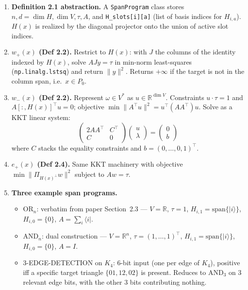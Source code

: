 \documentclass[11pt]{article}
\begin{document}
\begin{enumerate}
\item \textbf{Definition 2.1 abstraction.} A \texttt{SpanProgram} class stores $n, d = \dim H, \dim V, \tau, A$, and \texttt{H\_slots[i][a]} (list of basis indices for $H_{i,a}$). $H(x)$ is realized by the diagonal projector onto the union of active slot indices.

\item \textbf{$w_+(x)$ (Def 2.2).} Restrict to $H(x)$: with $J$ the columns of the identity indexed by $H(x)$, solve $A J y = \tau$ in min-norm least-squares (\texttt{np.linalg.lstsq}) and return $\|y\|^2$. Returns $+\infty$ if the target is not in the column span, i.e.\ $x \in P_0$.

\item \textbf{$w_-(x)$ (Def 2.2).} Represent $\omega \in V^*$ as $u \in \mathbb{R}^{\dim V}$. Constraints $u \cdot \tau = 1$ and $A[:, H(x)]^\top u = 0$; objective $\min \|A^\top u\|^2 = u^\top (A A^\top) u$. Solve as a KKT linear system:
\[
  \begin{pmatrix} 2 A A^\top & C^\top \\ C & 0 \end{pmatrix} \begin{pmatrix} u \\ \lambda \end{pmatrix} = \begin{pmatrix} 0 \\ b \end{pmatrix}
\]
where $C$ stacks the equality constraints and $b = (0,\dots,0,1)^\top$.

\item \textbf{$e_+(x)$ (Def 2.4).} Same KKT machinery with objective $\min \|\Pi_{H(x)^\perp} w\|^2$ subject to $A w = \tau$.

\item \textbf{Three example span programs.}
\begin{itemize}[nosep]
\item $\mathrm{OR}_n$: verbatim from paper Section~2.3 --- $V = \mathbb{R}$, $\tau = 1$, $H_{i,1} = \mathrm{span}\{|i\rangle\}$, $H_{i,0} = \{0\}$, $A = \sum_i \langle i|$.
\item $\mathrm{AND}_n$: dual construction --- $V = \mathbb{R}^n$, $\tau = (1,\dots,1)^\top$, $H_{i,1} = \mathrm{span}\{|i\rangle\}$, $H_{i,0} = \{0\}$, $A = I$.
\item 3-EDGE-DETECTION on $K_4$: 6-bit input (one per edge of $K_4$), positive iff a specific target triangle $\{01,12,02\}$ is present. Reduces to $\mathrm{AND}_3$ on 3 relevant edge bits, with the other 3 bits contributing nothing.
\end{itemize}


\end{enumerate}
\end{document}
